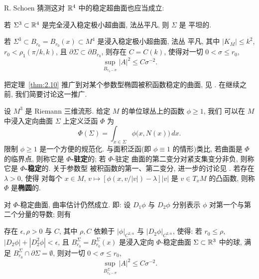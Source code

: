 R. Schoen 猜测这对 $\mathbb{R}^4$ 中的稳定超曲面也应当成立:

\begin{conjecture}[Schoen]
\label{conj:2.12}
若 $\Sigma^3\subset\mathbb{R}^4$ 是完全浸入稳定极小超曲面, 法丛平凡, 则 $\Sigma$ 是
平坦的.
\end{conjecture}

\begin{conjecture}[Schoen]
\label{conj:2.13}
若 $\Sigma^3\subset B_{r_0}=B_{r_0}(x)\subset M^4$ 是浸入稳定极小超曲面, 法丛
平凡, 其中 $|K_M|\leq k^{2}$, $r_0<\rho_1(\pi/k,k)$, 且
$\partial\Sigma\subset\partial B_{r_0}$, 则存在 $C=C(k)$, 使得对一切
$0<\sigma\leq r_0$,
\begin{equation}
\sup_{B_{r_0-\sigma}}|A|^{2}\leq C\sigma^{-2}.
\label{eq:2.68}
\end{equation}
\end{conjecture}

把定理~\ref{thm:2.10} 推广到对某个参数型椭圆被积函数稳定的曲面, 见
\cite{CM2}. 在继续之前, 我们简要讨论这一推广.

设 $M^3$ 是 Riemann 三维流形. 给定 $M$ 的单位球丛上的函数 $\phi\geq1$, 我们
可以在 $M$ 中浸入定向曲面 $\Sigma$ 上定义泛函 $\Phi$ 为
\begin{equation}
\Phi(\Sigma)=\int_{x\in\Sigma}\phi\bigl(x,N(x)\bigr)\,dx.
\label{eq:2.69}
\end{equation}
限制 $\phi\geq1$ 是一个方便的规范化. 与面积泛函(即 $\phi\equiv1$ 的情形)类比,
若曲面是 $\Phi$ 的临界点, 则称它是 \textbf{$\Phi$-驻定}的; 若 $\Phi$-驻定
曲面的第二变分对紧支集变分非负, 则称它是 \textbf{$\Phi$-稳定}的. 关于参数型
被积函数的第一、第二变分, 进一步的讨论见 \cite{Al2}. 若存在 $\lambda>0$, 使得
对每个 $x\in M$, $v\mapsto[\phi(x,v/|v|)-\lambda]|v|$ 是 $v\in T_xM$ 的凸函数,
则称 $\Phi$ 是\textbf{椭圆}的.

对 $\Phi$-稳定曲面, 曲率估计仍然成立. 即: 设 $D_1\phi$ 与 $D_2\phi$ 分别表示
$\phi$ 对第一个与第二个分量的导数; 则有

\begin{theorem}
\label{thm:2.14}
存在 $\epsilon,\rho>0$ 与 $C$, 其中 $\rho,C$ 依赖于
$|\phi|_{C^{2,\alpha}}$ 与 $|D_2\phi|_{C^{2,\alpha}}$, 使得: 若 $r_0\leq\rho$,
$|D_2\phi|+|D_2^{2}\phi|<\epsilon$, 且 $B_{r_0}^{\Sigma}=B_{r_0}^{\Sigma}(x)$
是浸入定向 $\Phi$-稳定曲面 $\Sigma\subset\mathbb{R}^3$ 中的球, 满足
$B_{r_0}^{\Sigma}\cap\partial\Sigma=\emptyset$, 则对一切 $0<\sigma\leq r_0$,
\begin{equation}
\sup_{B_{r_0-\sigma}^{\Sigma}}|A|^{2}\leq C\sigma^{-2}.
\label{eq:2.70}
\end{equation}
\end{theorem}

